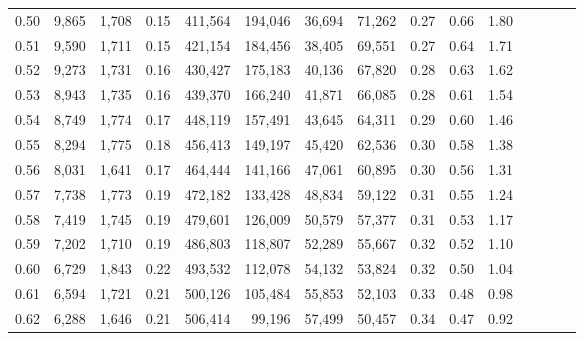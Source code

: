 \begin{tabular}{rrrcrrrrrrrrrrr}
0.50 &   9,865 &  1,708 &                                       0.15 &  411,564 &  194,046 &   36,694 &   71,262 &  0.27 &  0.66 &                         1.80 \\
0.51 &   9,590 &  1,711 &                                       0.15 &  421,154 &  184,456 &   38,405 &   69,551 &  0.27 &  0.64 &                         1.71 \\
0.52 &   9,273 &  1,731 &                                       0.16 &  430,427 &  175,183 &   40,136 &   67,820 &  0.28 &  0.63 &                         1.62 \\
0.53 &   8,943 &  1,735 &                                       0.16 &  439,370 &  166,240 &   41,871 &   66,085 &  0.28 &  0.61 &                         1.54 \\
0.54 &   8,749 &  1,774 &                                       0.17 &  448,119 &  157,491 &   43,645 &   64,311 &  0.29 &  0.60 &                         1.46 \\
0.55 &   8,294 &  1,775 &                                       0.18 &  456,413 &  149,197 &   45,420 &   62,536 &  0.30 &  0.58 &                         1.38 \\
0.56 &   8,031 &  1,641 &                                       0.17 &  464,444 &  141,166 &   47,061 &   60,895 &  0.30 &  0.56 &                         1.31 \\
0.57 &   7,738 &  1,773 &                                       0.19 &  472,182 &  133,428 &   48,834 &   59,122 &  0.31 &  0.55 &                         1.24 \\
0.58 &   7,419 &  1,745 &                                       0.19 &  479,601 &  126,009 &   50,579 &   57,377 &  0.31 &  0.53 &                         1.17 \\
0.59 &   7,202 &  1,710 &                                       0.19 &  486,803 &  118,807 &   52,289 &   55,667 &  0.32 &  0.52 &                         1.10 \\
0.60 &   6,729 &  1,843 &                                       0.22 &  493,532 &  112,078 &   54,132 &   53,824 &  0.32 &  0.50 &                         1.04 \\
0.61 &   6,594 &  1,721 &                                       0.21 &  500,126 &  105,484 &   55,853 &   52,103 &  0.33 &  0.48 &                         0.98 \\
0.62 &   6,288 &  1,646 &                                       0.21 &  506,414 &   99,196 &   57,499 &   50,457 &  0.34 &  0.47 &                         0.92 \\

\end{tabular}
